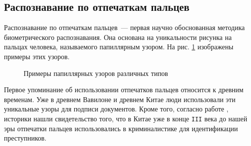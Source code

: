 \documentclass[14pt, a4paper]{extarticle}
\begin{document}
\subsection{Распознавание по отпечаткам пальцев}
Распознавание по отпечаткам пальцев~--- первая научно обоснованная методика биометрического распознавания. Она основана на уникальности рисунка на пальцах человека, называемого папиллярным узором. На рис. \ref{img:fingerprints} изображены примеры этих узоров.

\begin{center}
	\begin{figure}[h!]
		\centering
		\hspace{0.05\textwidth}
		\hspace{0.05\textwidth}
		\caption{Примеры папиллярных узоров различных типов}
		\label{img:fingerprints}
	\end{figure}
\end{center}

\vspace{-1cm}

Первое упоминание об использовании отпечатков пальцев относится к древним временам. Уже в древнем Вавилоне и древнем Китае люди использовали эти уникальные узоры для подписи документов. Кроме того, согласно работе \cite{xiang1988historical}, историки нашли свидетельство того, что в Китае уже в конце \texttt{III} века до нашей эры отпечатки пальцев использовались в криминалистике для идентификации преступников. 
\end{document}
